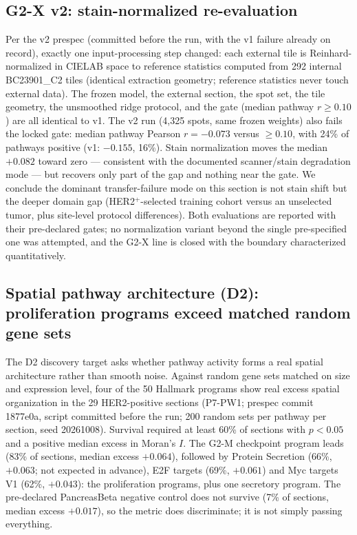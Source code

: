 \documentclass[11pt]{article}
\begin{document}
\subsection{G2-X v2: stain-normalized re-evaluation}\label{sec:g2xv2}
Per the v2 prespec (committed before the run, with the v1 failure already on
record), exactly one input-processing step changed: each external tile is
Reinhard-normalized in CIELAB space to reference statistics computed from 292
internal BC23901\_C2 tiles (identical extraction geometry; reference statistics
never touch external data). The frozen model, the external section, the spot
set, the tile geometry, the unsmoothed ridge protocol, and the gate (median
pathway $r \ge 0.10$) are all identical to v1. The v2 run (4{,}325 spots, same frozen weights) also fails the locked gate:
median pathway Pearson $r=-0.073$ versus $\ge 0.10$, with 24\% of pathways
positive (v1: $-0.155$, 16\%). Stain normalization moves the median $+0.082$
toward zero --- consistent with the documented scanner/stain degradation mode
--- but recovers only part of the gap and nothing near the gate. We conclude
the dominant transfer-failure mode on this section is not stain shift but the
deeper domain gap (HER2$^+$-selected training cohort versus an unselected
tumor, plus site-level protocol differences). Both evaluations are reported
with their pre-declared gates; no normalization variant beyond the single
pre-specified one was attempted, and the G2-X line is closed with the boundary
characterized quantitatively.

\subsection{Spatial pathway architecture (D2): proliferation programs exceed matched random gene sets}
The D2 discovery target asks whether pathway activity forms a real spatial
architecture rather than smooth noise. Against random gene sets matched on size and
expression level, four of the 50 Hallmark programs show real excess spatial
organization in the 29 HER2-positive sections (P7-PW1; prespec commit 1877e0a, script
committed before the run; 200 random sets per pathway per section, seed 20261008).
Survival required at least 60\% of sections with $p<0.05$ and a positive median
excess in Moran's $I$. The G2-M checkpoint program leads (83\% of sections,
median excess $+0.064$), followed by Protein Secretion (66\%, $+0.063$; not
expected in advance), E2F targets (69\%, $+0.061$) and Myc targets V1 (62\%,
$+0.043$): the proliferation programs, plus one secretory program. The
pre-declared PancreasBeta negative control does not survive (7\% of sections,
median excess $+0.017$), so the metric does discriminate; it is not simply
passing everything.
\end{document}
